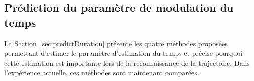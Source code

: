\documentclass[utf8]{frontiersSCNS} %
\begin{document}

\subsection{Prédiction du paramètre de modulation du temps}\label{sec:simulatedTimeModulationModels}
La Section~\ref{sec:predictDuration} présente les quatre méthodes proposées permettant d'estimer le paramètre d'estimation du temps et précise pourquoi cette estimation est importante lors de la reconnaissance de la trajectoire. 
Dans l'expérience actuelle, ces méthodes sont maintenant comparées.



\end{document}

